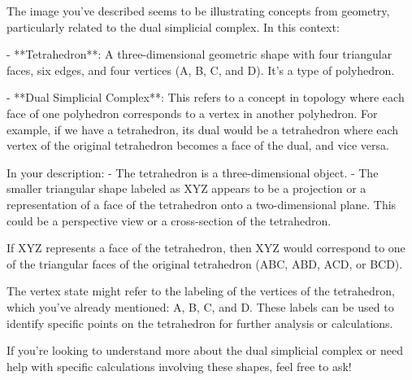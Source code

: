 The image you've described seems to be illustrating concepts from geometry, particularly related to the dual simplicial complex. In this context:

- **Tetrahedron**: A three-dimensional geometric shape with four triangular faces, six edges, and four vertices (A, B, C, and D). It's a type of polyhedron.

- **Dual Simplicial Complex**: This refers to a concept in topology where each face of one polyhedron corresponds to a vertex in another polyhedron. For example, if we have a tetrahedron, its dual would be a tetrahedron where each vertex of the original tetrahedron becomes a face of the dual, and vice versa.

In your description:
- The tetrahedron is a three-dimensional object.
- The smaller triangular shape labeled as XYZ appears to be a projection or a representation of a face of the tetrahedron onto a two-dimensional plane. This could be a perspective view or a cross-section of the tetrahedron.

If XYZ represents a face of the tetrahedron, then XYZ would correspond to one of the triangular faces of the original tetrahedron (ABC, ABD, ACD, or BCD).

The vertex state might refer to the labeling of the vertices of the tetrahedron, which you've already mentioned: A, B, C, and D. These labels can be used to identify specific points on the tetrahedron for further analysis or calculations.

If you're looking to understand more about the dual simplicial complex or need help with specific calculations involving these shapes, feel free to ask!